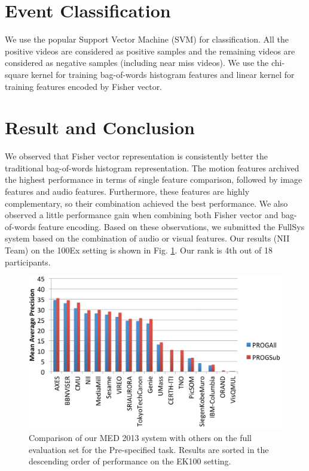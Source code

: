 \section{Event Classification}
We use the popular Support Vector Machine (SVM) for classification. All the positive videos are considered as positive samples and the remaining videos are considered as negative samples (including near miss videos). We use the chi-square kernel for training bag-of-words histogram features and linear kernel for training features encoded by Fisher vector.

\section{Result and Conclusion} We observed that Fisher vector representation is consistently better the traditional bag-of-words histogram representation. The motion features archived the highest performance in terms of single feature comparison, followed by image features and audio features. Furthermore, these features are highly complementary, so their combination achieved the best performance. We also observed a little performance gain when combining both Fisher vector and bag-of-words feature encoding. Based on these observations, we submitted the FullSys system based on the combination of audio or visual features. Our results (NII Team) on the 100Ex setting is shown in Fig. \ref{med2013_result}. Our rank is 4th out of 18 participants.

\begin{figure}
	\centering
	\includegraphics[width=1\textwidth]{results.pdf}
	\caption{Comparison of our MED 2013 system with others on the full evaluation set for the Pre-specified task. Results are sorted in the descending order of performance on the EK100 setting.}
	\label{med2013_result}
\end{figure} 